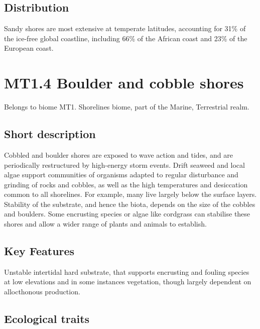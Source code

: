 \documentclass[
  letterpaper,
  DIV=11,
  numbers=noendperiod]{scrartcl}
\begin{document}
\subsection{Distribution}\label{distribution-54}

Sandy shores are most extensive at temperate latitudes, accounting for
31\% of the ice-free global coastline, including 66\% of the African
coast and 23\% of the European coast.

\section{MT1.4 Boulder and cobble
shores}\label{mt1.4-boulder-and-cobble-shores}

Belongs to biome MT1. Shorelines biome, part of the Marine, Terrestrial
realm.

\subsection{Short description}\label{short-description-55}

Cobbled and boulder shores are exposed to wave action and tides, and are
periodically restructured by high-energy storm events. Drift seaweed and
local algae support communities of organisms adapted to regular
disturbance and grinding of rocks and cobbles, as well as the high
temperatures and desiccation common to all shorelines. For example, many
live largely below the surface layers. Stability of the substrate, and
hence the biota, depends on the size of the cobbles and boulders. Some
encrusting species or algae like cordgrass can stabilise these shores
and allow a wider range of plants and animals to establish.

\subsection{Key Features}\label{key-features-55}

Unstable intertidal hard substrate, that supports encrusting and fouling
species at low elevations and in some instances vegetation, though
largely dependent on allocthonous production.

\subsection{Ecological traits}\label{ecological-traits-55}
\end{document}

